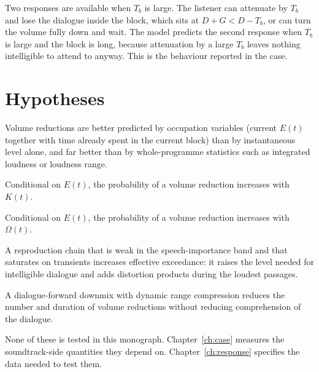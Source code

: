 Two responses are available when $T_b$ is large. The listener can attenuate by $T_b$ and lose the dialogue inside the block, which sits at $D + G < D - T_b$, or can turn the volume fully down and wait. The model predicts the second response when $T_b$ is large and the block is long, because attenuation by a large $T_b$ leaves nothing intelligible to attend to anyway. This is the behaviour reported in the case.

\section{Hypotheses}

\begin{hypothesis}
Volume reductions are better predicted by occupation variables (current $E(t)$ together with time already spent in the current block) than by instantaneous level alone, and far better than by whole-programme statistics such as integrated loudness or loudness range.
\end{hypothesis}

\begin{hypothesis}
Conditional on $E(t)$, the probability of a volume reduction increases with $K(t)$.
\end{hypothesis}

\begin{hypothesis}[Overdetermination]
Conditional on $E(t)$, the probability of a volume reduction increases with $\Omega(t)$.
\end{hypothesis}

\begin{hypothesis}
A reproduction chain that is weak in the speech-importance band and that saturates on transients increases effective exceedance: it raises the level needed for intelligible dialogue and adds distortion products during the loudest passages.
\end{hypothesis}

\begin{hypothesis}[Intervention]
A dialogue-forward downmix with dynamic range compression reduces the number and duration of volume reductions without reducing comprehension of the dialogue.
\end{hypothesis}

None of these is tested in this monograph. Chapter~\ref{ch:case} measures the soundtrack-side quantities they depend on. Chapter~\ref{ch:response} specifies the data needed to test them.
